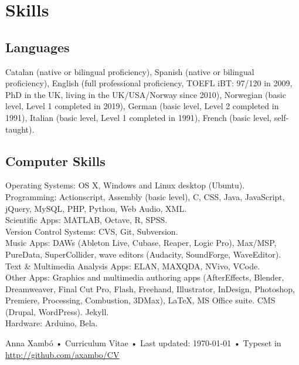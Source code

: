 \documentclass[10pt, a4paper]{article}
\begin{document}
\section*{Skills}
\noindent

\subsection*{Languages}
\noindent

Catalan (native or bilingual proficiency), Spanish (native or bilingual proficiency), English (full professional proficiency, TOEFL iBT: 97/120 in 2009, PhD in the UK, living in the UK/USA/Norway since 2010), Norwegian (basic level, Level 1 completed in 2019), German (basic level, Level 2 completed in 1991), Italian (basic level, Level 1 completed in 1991), French (basic level, self-taught).

\subsection*{Computer Skills}
\noindent

Operating Systems: OS X, Windows and Linux desktop (Ubuntu).\\
Programming: Actionscript, Assembly (basic level), C, CSS, Java, JavaScript, jQuery, MySQL, PHP, Python, Web Audio, XML.\\
Scientific Apps: MATLAB, Octave, R, SPSS.\\
Version Control Systems: CVS, Git, Subversion.\\
Music Apps: DAWs (Ableton Live, Cubase, Reaper, Logic Pro), Max/MSP, PureData, SuperCollider, wave editors (Audacity, SoundForge, WaveEditor).\\
Text \& Multimedia Analysis Apps: ELAN, MAXQDA, NVivo, VCode.\\
Other Apps: Graphics and multimedia authoring apps (AfterEffects, Blender, Dreamweaver, Final Cut Pro, Flash, Freehand, Illustrator, InDesign, Photoshop, Premiere, Processing, Combustion, 3DMax), LaTeX, MS Office suite. CMS (Drupal, WordPress). Jekyll.\\
Hardware: Arduino, Bela.

\vfill{}

\begin{center}
{\scriptsize  Anna Xambó •\- Curriculum Vitae •\- Last updated: \today\- •\- %
Typeset in \href{http://nitens.org/taraborelli/cvtex}{
\XeTeX }\\
\href{http://github.com/axambo/CV}{http://github.com/axambo/CV}}
\end{center}
\end{document}
